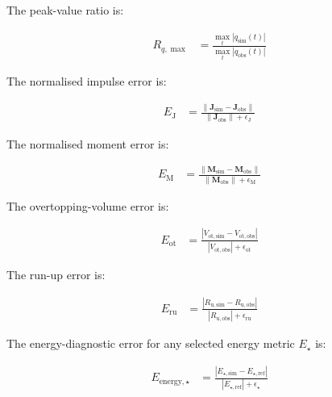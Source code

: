The peak-value ratio is:

\begin{align}
  R_{q,\max}
  &=
  \frac{
    \max_{t}
    \left|
    q_{\mathrm{sim}}(t)
    \right|
  }{
    \max_{t}
    \left|
    q_{\mathrm{obs}}(t)
    \right|
  }
  \label{eq:res-ver-met-local-peak-ratio}
\end{align}

The normalised impulse error is:

\begin{align}
  E_{\mathrm{J}}
  &=
  \frac{
    \left\lVert
    \mathbf{J}_{\mathrm{sim}}
    -
    \mathbf{J}_{\mathrm{obs}}
    \right\rVert
  }{
    \left\lVert
    \mathbf{J}_{\mathrm{obs}}
    \right\rVert
    +
    \epsilon_{\mathrm{J}}
  }
  \label{eq:res-ver-met-local-impulse-error}
\end{align}

The normalised moment error is:

\begin{align}
  E_{\mathrm{M}}
  &=
  \frac{
    \left\lVert
    \mathbf{M}_{\mathrm{sim}}
    -
    \mathbf{M}_{\mathrm{obs}}
    \right\rVert
  }{
    \left\lVert
    \mathbf{M}_{\mathrm{obs}}
    \right\rVert
    +
    \epsilon_{\mathrm{M}}
  }
  \label{eq:res-ver-met-local-moment-error}
\end{align}

The overtopping-volume error is:

\begin{align}
  E_{\mathrm{ot}}
  &=
  \frac{
    \left|
      V_{\mathrm{ot,sim}}
      -
      V_{\mathrm{ot,obs}}
    \right|
  }{
    \left|
      V_{\mathrm{ot,obs}}
    \right|
    +
    \epsilon_{\mathrm{ot}}
  }
  \label{eq:res-ver-met-overtopping-error}
\end{align}

The run-up error is:

\begin{align}
  E_{\mathrm{ru}}
  &=
  \frac{
    \left|
      R_{\mathrm{u,sim}}
      -
      R_{\mathrm{u,obs}}
    \right|
  }{
    \left|
      R_{\mathrm{u,obs}}
    \right|
    +
    \epsilon_{\mathrm{ru}}
  }
  \label{eq:res-ver-met-runup-error}
\end{align}

The energy-diagnostic error for any selected energy metric $E_\star$
is:

\begin{align}
  E_{\mathrm{energy},\star}
  &=
  \frac{
    \left|
      E_{\star,\mathrm{sim}}
      -
      E_{\star,\mathrm{ref}}
    \right|
  }{
    \left|
      E_{\star,\mathrm{ref}}
    \right|
    +
    \epsilon_{\star}
  }
  \label{eq:res-ver-met-energy-metric-error}
\end{align}

